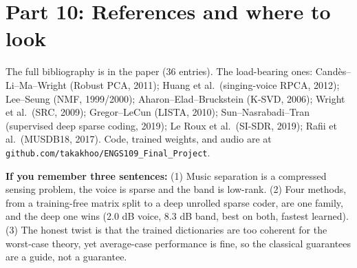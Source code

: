 \documentclass[11pt]{article}
\begin{document}
\section{Part 10: References and where to look}
The full bibliography is in the paper (36 entries). The load-bearing ones:
Cand\`es--Li--Ma--Wright (Robust PCA, 2011); Huang et al.\ (singing-voice RPCA,
2012); Lee--Seung (NMF, 1999/2000); Aharon--Elad--Bruckstein (K-SVD, 2006);
Wright et al.\ (SRC, 2009); Gregor--LeCun (LISTA, 2010); Sun--Nasrabadi--Tran
(supervised deep sparse coding, 2019); Le Roux et al.\ (SI-SDR, 2019); Rafii et al.\
(MUSDB18, 2017). Code, trained weights, and audio are at
\texttt{github.com/takakhoo/ENGS109\_Final\_Project}.

\vspace{1em}
\begin{keypoint}
\textbf{If you remember three sentences:} (1) Music separation is a compressed
sensing problem, the voice is sparse and the band is low-rank. (2) Four methods,
from a training-free matrix split to a deep unrolled sparse coder, are one family,
and the deep one wins (2.0 dB voice, 8.3 dB band, best on both, fastest learned).
(3) The honest twist is that the trained dictionaries are too coherent for the
worst-case theory, yet average-case performance is fine, so the classical
guarantees are a guide, not a guarantee.
\end{keypoint}
\end{document}
